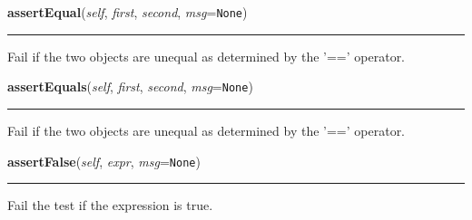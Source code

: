     \vspace{0.5ex}

    \begin{boxedminipage}{\textwidth}

    \raggedright \textbf{assertEqual}(\textit{self}, \textit{first}, \textit{second}, \textit{msg}=\texttt{None})

    \vspace{-1.5ex}

    \rule{\textwidth}{0.5\fboxrule}
    Fail if the two objects are unequal as determined by the '==' operator.

    \vspace{1ex}

    \end{boxedminipage}

    \label{unittest:TestCase:failUnlessEqual}

    \vspace{0.5ex}

    \begin{boxedminipage}{\textwidth}

    \raggedright \textbf{assertEquals}(\textit{self}, \textit{first}, \textit{second}, \textit{msg}=\texttt{None})

    \vspace{-1.5ex}

    \rule{\textwidth}{0.5\fboxrule}
    Fail if the two objects are unequal as determined by the '==' operator.

    \vspace{1ex}

    \end{boxedminipage}

    \label{unittest:TestCase:failIf}

    \vspace{0.5ex}

    \begin{boxedminipage}{\textwidth}

    \raggedright \textbf{assertFalse}(\textit{self}, \textit{expr}, \textit{msg}=\texttt{None})

    \vspace{-1.5ex}

    \rule{\textwidth}{0.5\fboxrule}
    Fail the test if the expression is true.

    \vspace{1ex}

    \end{boxedminipage}

